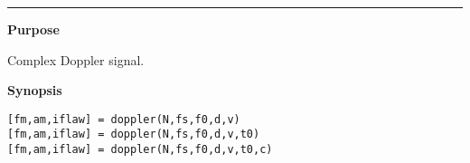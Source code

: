 


\hspace*{-1.6cm}{\Large \bf doppler}

\vspace*{-.4cm}
\hspace*{-1.6cm}\rule[0in]{16.5cm}{.02cm}
\vspace*{.2cm}



{\bf \large {}\selectfont Purpose}\\
\hspace*{1.5cm}
\begin{minipage}[t]{13.5cm}
Complex Doppler signal.
\end{minipage}
\vspace*{.5cm}


{\bf \large {}\selectfont Synopsis}\\
\hspace*{1.5cm}
\begin{minipage}[t]{13.5cm}
\begin{verbatim}
[fm,am,iflaw] = doppler(N,fs,f0,d,v) 
[fm,am,iflaw] = doppler(N,fs,f0,d,v,t0) 
[fm,am,iflaw] = doppler(N,fs,f0,d,v,t0,c) 
\end{verbatim}
\end{minipage}
\vspace*{.5cm}


